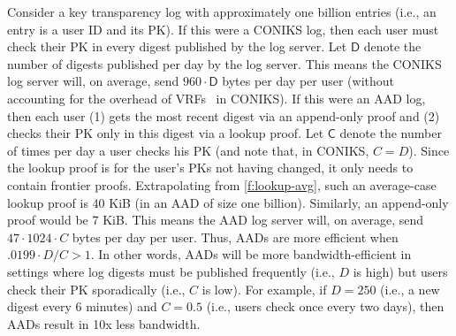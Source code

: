 \newcommand{\coniksfreq}{\ensuremath{\mathbf{\mathsf{D}}}\xspace}
\newcommand{\checkfreq}{\ensuremath{\mathbf{\mathsf{C}}}\xspace}

Consider a key transparency log with approximately one billion entries (i.e., an entry is a user ID and its PK).
If this were a CONIKS log, then each user must check their PK in every digest published by the log server.
Let \coniksfreq denote the number of digests published per day by the log server.
This means the CONIKS log server will, on average, send $960 \cdot \coniksfreq$ bytes per day per user (without accounting for the overhead of VRFs~\cite{vrf} in CONIKS).
If this were an AAD log, then each user (1) gets the most recent digest via an append-only proof and (2) checks their PK only in this digest via a lookup proof.
Let \checkfreq denote the number of times per day a user checks his PK (and note that, in CONIKS, $C = D$).
Since the lookup proof is for the user's PKs not having changed, it only needs to contain frontier proofs.
Extrapolating from \cref{f:lookup-avg}, such an average-case lookup proof is 40 KiB (in an AAD of size one billion).
Similarly, an append-only proof would be 7 KiB.
This means the AAD log server will, on average, send $47 \cdot 1024 \cdot C$ bytes per day per user.
Thus, AADs are more efficient when $.0199 \cdot D / C > 1$.
In other words, AADs will be more bandwidth-efficient in settings where log digests must be published frequently (i.e., $D$ is high) but users check their PK sporadically (i.e., $C$ is low).
For example, if $D=250$ (i.e., a new digest every 6 minutes) and $C=0.5$ (i.e., users check once every two days), then AADs result in 10x less bandwidth.

